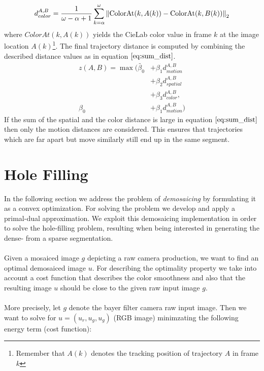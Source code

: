\begin{equation}
	d_{color}^{A,B} = \frac{1}{\omega - \alpha + 1} \sum_{k=\alpha}^\omega \left\lVert\text{ColorAt}(k, A(k)) - \text{ColorAt}(k, B(k))\right\rVert_2
	\label{eq:color_dist}
\end{equation}
where $ColorAt(k, A(k))$ yields the CieLab color value in frame $k$ at the image location $A(k)$\footnote{Remember that $A(k)$ denotes the tracking position of trajectory $A$ in frame $k$}.
The final trajectory distance is computed by combining the described distance values as in equation $\ref{eq:sum_dist}$.
\begin{equation}
\begin{aligned}
z ( A, B ) = \max (\tilde{\beta_0} & + \beta_1 d_{motion}^{A,B} \\
& + \beta_2 d_{spatial}^{A,B} \\
& + \beta_3 d_{color}^{A,B},\\
\beta_0 & + \beta_1 d_{motion}^{A,B} )
\end{aligned}
\label{eq:sum_dist}
\end{equation}
If the sum of the spatial and the color distance is large in equation $\ref{eq:sum_dist}$ then only the motion distances are considered. This ensures that trajectories which are far apart but move similarly still end up in the same segment.

\section{Hole Filling}
In the following section we address the problem of \emph{demosaicing} by formulating it as a convex optimization. For solving the problem we develop and apply a primal-dual approximation. We exploit this demosaicing implementation in order to solve the hole-filling problem, resulting when being interested in generating the dense- from a sparse segmentation. \\ \\
Given a mosaiced image $g$ depicting a raw camera production, we want to find an optimal demosaiced image $u$. For describing the optimality property we take into account a cost function that describes the color smoothness and also that the resulting image $u$ should be close to the given raw input image $g$. \\ \\
More precisely, let $g$ denote the bayer filter camera raw input image. Then we want to solve for $u=(u_r, u_g, u_g)$ (RGB image) minimzating the following energy term (cost function):

